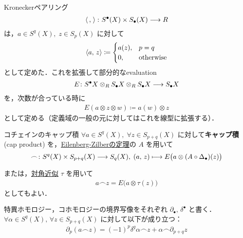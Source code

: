 \documentclass[algtopo_main]{subfiles}
\begin{document}
Kroneckerペアリング
\begin{align}
    \expval{\, ,\;} \colon S^\bullet (X) \times S_\bullet (X) \longrightarrow R
\end{align}
は，$a \in S^q(X),\; z \in S_p(X)$ に対して
\begin{align}
    \expval{a,\, z} \coloneqq 
    \begin{cases}
        a(z), &p=q \\
        0, &\text{otherwise}
    \end{cases}
\end{align}
として定めた．これを拡張して部分的なevaluation
\begin{align}
    E \colon S^\bullet X \otimes_R S_\bullet X \otimes_R S_\bullet X \longrightarrow S_\bullet X
\end{align}
を，次数が合っている時に
\begin{align}
    E(a \otimes z \otimes w) \coloneqq a(w) \otimes z
\end{align}
として定める（定義域の一般の元に対してはこれを線型に拡張する）．

\begin{mydef}[label=def:cap-cochain]{コチェインのキャップ積}
    $\forall a \in S^q(X),\;\forall z \in S_{p+q}(X)$ に対して\textbf{キャップ積} (cap product) を，\hyperref[thm:EZ]{Eilenberg-Zilberの定理}の $A$ を用いて
    \begin{align}
        \frown \colon S^q(X) \times S_{p+q} (X) \longrightarrow S_q(X),\; (a,\, z) \longmapsto E \bigl( a \otimes (A \circ \Delta_\bullet)(z) \bigr) 
    \end{align}
\end{mydef}

または，\hyperref[def:d-approx]{対角近似} $\tau$ を用いて
\begin{align}
    a \frown z = E\bigl(a \otimes \tau(z)\bigr)
\end{align}
としてもよい．

\begin{mylem}[label=lem:cap-1]{}
    特異ホモロジー，コホモロジーの境界写像をそれぞれ $\partial_\bullet,\, \delta^\bullet$ と書く．
    $\forall \alpha \in S^q(X),\, \forall z \in S_{p+q} (X)$ に対して以下が成り立つ：
    \begin{align}
        \partial_p(a \frown z) = (-1)^p \delta^q\alpha \frown z + \alpha \frown \partial_{p+q}z
    \end{align}
\end{mylem}
\end{document}
